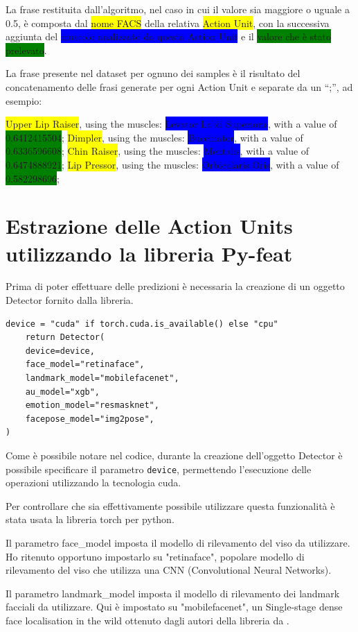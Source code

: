 La frase restituita dall’algoritmo, nel caso in cui il valore sia maggiore o uguale a 0.5, è composta dal \colorbox{yellow}{nome FACS} della relativa \colorbox{yellow}{Action Unit}, con la successiva aggiunta del \colorbox{blue}{muscolo analizzato da questa Action Unit} e il \colorbox{green}{valore che è stato prelevato}.

La frase presente nel dataset per ognuno dei samples è il risultato del concatenamento delle frasi generate per ogni Action Unit e separate da un “;”, ad esempio:

\colorbox{yellow}{Upper Lip Raiser}, using the muscles: \colorbox{blue}{Levator Labii Superioris}, with a value of \colorbox{green}{0.6412415504}; \colorbox{yellow}{Dimpler}, using the muscles: \colorbox{blue}{Buccinator}, with a value of \colorbox{green}{0.6336596608}; \colorbox{yellow}{Chin Raiser}, using the muscles: \colorbox{blue}{Mentalis}, with a value of \colorbox{green}{0.6474888921}; \colorbox{yellow}{Lip Pressor}, using the muscles: \colorbox{blue}{Orbicularis Oris}, with a value of \colorbox{green}{0.582298696};


\section{Estrazione delle Action Units utilizzando la libreria Py-feat}
Prima di poter effettuare delle predizioni è necessaria la creazione di un oggetto Detector fornito dalla libreria.
\begin{verbatim}
device = "cuda" if torch.cuda.is_available() else "cpu"
    return Detector(
    device=device,
    face_model="retinaface",
    landmark_model="mobilefacenet",
    au_model="xgb",
    emotion_model="resmasknet",
    facepose_model="img2pose",
)
\end{verbatim}
Come è possibile notare nel codice, durante la creazione dell’oggetto Detector è possibile specificare il parametro \texttt{device}, permettendo l’esecuzione delle operazioni utilizzando la tecnologia cuda. 

Per controllare che sia effettivamente possibile utilizzare questa funzionalità è stata usata la libreria torch per python.

Il parametro face\_model imposta il modello di rilevamento del viso da utilizzare. Ho ritenuto opportuno impostarlo su "retinaface", popolare modello di rilevamento del viso che utilizza una CNN (Convolutional Neural Networks).

Il parametro landmark\_model imposta il modello di rilevamento dei landmark facciali da utilizzare. Qui è impostato su "mobilefacenet", un Single-stage dense face localisation in the wild ottenuto dagli autori della libreria da \cite{Chen2018MobileFaceNets} .

